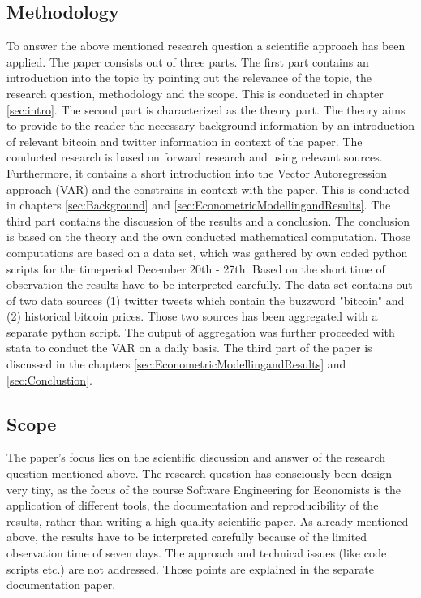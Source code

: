 \documentclass[a4paper,american,12pt]{article}
\begin{document}
\begin{spacing}{1.2}
\subsection{Methodology}
\label{sec:Methodology}
To answer the above mentioned research question a scientific approach has been applied. The paper consists out of three parts. The first part contains an introduction into the topic by pointing out the relevance of the topic, the research question, methodology and the scope. This is conducted in chapter \ref{sec:intro}. The second part is characterized as the theory part. The theory aims to provide to the reader the necessary background information by an introduction of relevant bitcoin and twitter information in context of the paper. The conducted research is based on forward research and using relevant sources. Furthermore, it contains a short introduction into the Vector Autoregression approach (VAR) and the constrains in context with the paper. This is conducted in chapters \ref{sec:Background} and \ref{sec:EconometricModellingandResults}. The third part contains the discussion of the results and a conclusion. The conclusion is based on the theory and the own conducted mathematical computation. Those computations are based on a data set, which was gathered by own coded python scripts for the timeperiod December 20th - 27th. Based on the short time of observation the results have to be interpreted carefully. The data set contains out of two data sources (1) twitter tweets which contain the buzzword "bitcoin" and (2) historical bitcoin prices. Those two sources has been aggregated with a separate python script. The output of aggregation was further proceeded with stata to conduct the VAR on a daily basis. The third part of the paper is discussed in the chapters \ref{sec:EconometricModellingandResults} and \ref{sec:Conclustion}.

\subsection{Scope}
\label{sec:Scope}
The paper's focus lies on the scientific discussion and answer of the research question mentioned above. The research question has consciously been design very tiny, as the focus of the course Software Engineering for Economists is the application of different tools, the documentation and reproducibility of the results, rather than writing a high quality scientific paper. As already mentioned above, the results have to be interpreted carefully because of the limited observation time of seven days. The approach and technical issues (like code scripts etc.) are not addressed. Those points are explained in the separate documentation paper.


\end{spacing}
\end{document}

